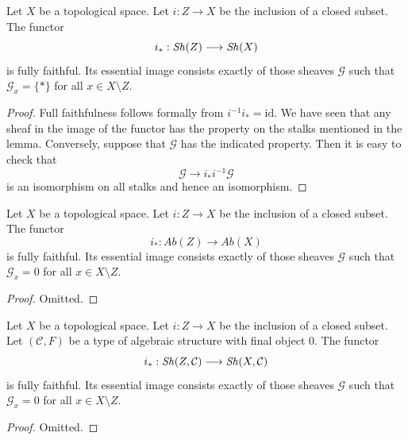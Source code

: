 \begin{lemma}
\label{lemma-equivalence-categories-closed}
Let $X$ be a topological space.
Let $i : Z \to X$ be the inclusion of a closed subset.
The functor
$$
i_* : \mathop{\mathit{Sh}}\nolimits(Z) \longrightarrow \mathop{\mathit{Sh}}\nolimits(X)
$$
is fully faithful. Its essential image consists exactly
of those sheaves $\mathcal{G}$ such that
$\mathcal{G}_x = \{*\}$ for all $x \in X \setminus Z$.
\end{lemma}

\begin{proof}
Full faithfulness follows formally from $i^{-1} i_* = \text{id}$.
We have seen that any sheaf in the image of the functor has
the property on the stalks mentioned in the lemma. Conversely, suppose
that $\mathcal{G}$ has the indicated property.
Then it is easy to check that
$$
\mathcal{G} \to i_* i^{-1} \mathcal{G}
$$
is an isomorphism on all stalks and hence an isomorphism.
\end{proof}

\begin{lemma}
\label{lemma-equivalence-categories-closed-abelian}
\begin{reference}
\cite[Chapter I, \S 1, no. 5, Propositions 5 and 6, p. 202]{FAC}
\end{reference}
Let $X$ be a topological space.
Let $i : Z \to X$ be the inclusion of a closed subset.
The functor
$$
i_* : \textit{Ab}(Z) \longrightarrow \textit{Ab}(X)
$$
is fully faithful. Its essential image consists exactly
of those sheaves $\mathcal{G}$ such that
$\mathcal{G}_x = 0$ for all $x \in X \setminus Z$.
\end{lemma}

\begin{proof}
Omitted.
\end{proof}

\begin{lemma}
\label{lemma-equivalence-categories-closed-structures}
Let $X$ be a topological space.
Let $i : Z \to X$ be the inclusion of a closed subset.
Let $(\mathcal{C}, F)$ be a type of algebraic structure
with final object $0$. The functor
$$
i_* : \mathop{\mathit{Sh}}\nolimits(Z, \mathcal{C}) \longrightarrow \mathop{\mathit{Sh}}\nolimits(X, \mathcal{C})
$$
is fully faithful. Its essential image consists exactly
of those sheaves $\mathcal{G}$ such that
$\mathcal{G}_x = 0$ for all $x \in X \setminus Z$.
\end{lemma}

\begin{proof}
Omitted.
\end{proof}

